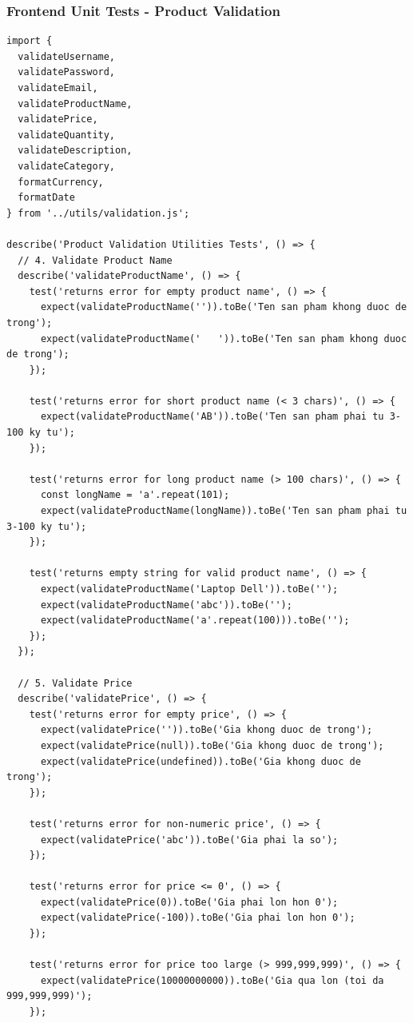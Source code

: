 \subsubsection{Frontend Unit Tests - Product Validation}
\begin{lstlisting}[caption=Frontend Product Validation Tests]
import {
  validateUsername,
  validatePassword,
  validateEmail,
  validateProductName,
  validatePrice,
  validateQuantity,
  validateDescription,
  validateCategory,
  formatCurrency,
  formatDate
} from '../utils/validation.js';

describe('Product Validation Utilities Tests', () => {
  // 4. Validate Product Name
  describe('validateProductName', () => {
    test('returns error for empty product name', () => {
      expect(validateProductName('')).toBe('Ten san pham khong duoc de trong');
      expect(validateProductName('   ')).toBe('Ten san pham khong duoc de trong');
    });

    test('returns error for short product name (< 3 chars)', () => {
      expect(validateProductName('AB')).toBe('Ten san pham phai tu 3-100 ky tu');
    });

    test('returns error for long product name (> 100 chars)', () => {
      const longName = 'a'.repeat(101);
      expect(validateProductName(longName)).toBe('Ten san pham phai tu 3-100 ky tu');
    });

    test('returns empty string for valid product name', () => {
      expect(validateProductName('Laptop Dell')).toBe('');
      expect(validateProductName('abc')).toBe('');
      expect(validateProductName('a'.repeat(100))).toBe('');
    });
  });

  // 5. Validate Price
  describe('validatePrice', () => {
    test('returns error for empty price', () => {
      expect(validatePrice('')).toBe('Gia khong duoc de trong');
      expect(validatePrice(null)).toBe('Gia khong duoc de trong');
      expect(validatePrice(undefined)).toBe('Gia khong duoc de trong');
    });

    test('returns error for non-numeric price', () => {
      expect(validatePrice('abc')).toBe('Gia phai la so');
    });

    test('returns error for price <= 0', () => {
      expect(validatePrice(0)).toBe('Gia phai lon hon 0');
      expect(validatePrice(-100)).toBe('Gia phai lon hon 0');
    });

    test('returns error for price too large (> 999,999,999)', () => {
      expect(validatePrice(10000000000)).toBe('Gia qua lon (toi da 999,999,999)');
    });


\end{lstlisting}
